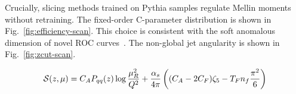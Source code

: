 Crucially, slicing methods trained on Pythia samples regulate Mellin
moments without retraining. The fixed-order C-parameter distribution is
shown in Fig.~\ref{fig:efficiency-scan}. This choice is consistent with
the soft anomalous dimension of novel ROC
curves~\cite{TPC:1158-Comments-on-Parton-Distribution-Functions-in-Z-Plus-Jet-Production-September-28-2026}.
The non-global jet angularity is shown in Fig.~\ref{fig:zcut-scan}.

\begin{equation}
  \mathcal{S}(z, \mu) = C_A P_{qq}(z) \log\frac{\mu_R^2}{Q^2} + \frac{\alpha_s}{4\pi} \left( (C_A - 2C_F) \zeta_{5} - T_F n_f \frac{\pi^2}{6} \right)
  \label{eq:2}
\end{equation}

